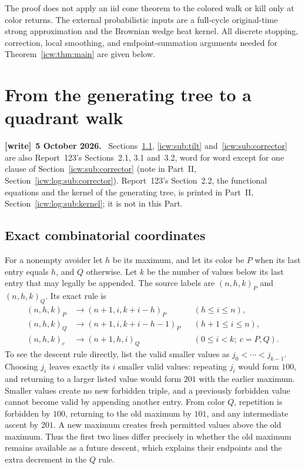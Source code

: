 \documentclass[11pt,letterpaper]{article}
\theoremstyle{remark}\newtheorem{remark}[theorem]{Remark}
\newcommand{\1}{\mathbf1}
\newenvironment{writenote}[1][]{\par\smallskip\begingroup\small
 \noindent\textbf{[write]}\if\relax\detokenize{#1}\relax\else~\textbf{#1.}\fi\ }%
 {\par\endgroup\smallskip}
\begin{document}
The proof does not apply an iid cone theorem to the colored walk or kill
only at color returns. The external probabilistic inputs are a full-cycle
original-time strong approximation and the Brownian wedge heat kernel.
All discrete stopping, correction, local smoothing, and endpoint-summation
arguments needed for Theorem~\ref{icw:thm:main} are given below.
\section{From the generating tree to a quadrant walk}\label{icw:sec:tree}
\begin{writenote}[5 October 2026]
Sections~\ref{icw:sub:exact}, \ref{icw:sub:tilt} and~\ref{icw:sub:corrector} are also Report~123's Sections~2.1, 3.1 and~3.2, word for word except for one clause of Section~\ref{icw:sub:corrector} (note in Part~II, Section~\ref{icw:log:sub:corrector}). Report~123's Section~2.2, the functional equations and the kernel of the generating tree, is printed in Part~II, Section~\ref{icw:log:sub:kernel}; it is not in this Part.
\end{writenote}
\subsection{Exact combinatorial coordinates}\label{icw:sub:exact}
For a nonempty avoider let $h$ be its maximum, and let its color be $P$
when its last entry equals $h$, and $Q$ otherwise. Let $k$ be the number
of values below its last entry that may legally be appended. The source
labels are $(n,h,k)_P$ and $(n,h,k)_Q$. Its exact rule is
\begin{align*}
 (n,h,k)_P&\longrightarrow(n+1,i,k+i-h)_P &&(h\le i\le n),\\
 (n,h,k)_Q&\longrightarrow(n+1,i,k+i-h-1)_P &&(h+1\le i\le n),\\
 (n,h,k)_c&\longrightarrow(n+1,h,i)_Q &&(0\le i<k;\ c=P,Q).
\end{align*}
To see the descent rule directly, list the valid smaller values as
$j_0<\cdots<j_{k-1}$. Choosing $j_i$ leaves exactly its $i$ smaller
valid values: repeating $j_i$ would form $100$, and returning to a larger
listed value would form $201$ with the earlier maximum. Smaller values
create no new forbidden triple, and a previously forbidden value cannot
become valid by appending another entry. From color $Q$, repetition is
forbidden by $100$, returning to the old maximum by $101$, and any
intermediate ascent by $201$. A new maximum creates fresh permitted
values above the old maximum. Thus the first two lines differ precisely
in whether the old maximum remains available as a future descent,
which explains their endpoints and the extra decrement in the $Q$ rule.
\end{document}
